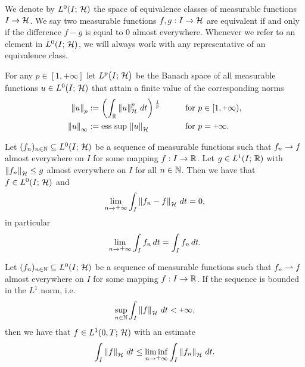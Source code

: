 \begin{definition}
	We denote by $ L^0(I;\,\mathcal{H}) $ the space of
	equivalence classes of measurable functions
	$ I\rightarrow\mathcal{H} $. We say two measurable functions 
	$ f,g:I\rightarrow\mathcal{H} $ are equivalent if and only
	if the difference $ f-g $ is equal to $ 0 $
	almost everywhere. Whenever we refer
	to an element in $ L^0(I;\,\mathcal{H}) $, we will
	always work with any representative of an equivalence
	class. 
\end{definition}

\begin{definition}\label{definition:lp space in hilbert space}
	For any $ p\in[1,\plus\infty] $ let $ L^{p}\big(I;\,\mathcal{H}\big) $
	be the Banach space of all measurable functions 
	$ u\in L^0(I;\,\mathcal{H}) $ that attain a finite value
	of the corresponding norms
	\begin{alignat*}{3}
		\atnorm{u}{p}&:=\left(\int_{\RR}\norm{u}^p\, dt\right)\strut^{\frac{1}{p}}
		\qquad &&\text{for }p\in [1,\plus\infty),\\
		\infnorm{u}&:=\esssup\,\norm{u}
		\qquad &&\text{for }p=\plus\infty.
	\end{alignat*}
\end{definition}

\begin{theorem}
	Let $ (f_n)_{n\in\mathbb{N}}\subseteq L^0(I;\,\mathcal{H}) $
	be a sequence of measurable functions such
	that $ f_n\rightarrow f $ almost everywhere on $ I $ 
	for some mapping $ f:I\rightarrow\mathbb{R} $. Let 
	$ g\in L^1(I;\,\mathbb{R}) $ with $ \left\Vert f_n\right\Vert_{\mathcal{H}}\leq g $
	almost everywhere on $ I $ for all $ n\in\mathbb{N} $.
	Then we have that $ f\in L^0(I;\,\mathcal{H}) $ and
	\begin{align*}
		\lim_{n\ra\plus\infty}\int_I \norm{f_n-f}\,dt
		=0,
	\end{align*}
	in particular
	\begin{align*}
		\lim_{n\ra\plus\infty}\int_I f_n\,dt
		=\int_I f_n\,dt.
	\end{align*}
\end{theorem}

\begin{theorem}
	Let $ (f_n)_{n\in\mathbb{N}}\subseteq L^0(I;\,\mathcal{H}) $
	be a sequence of measurable functions such
	that $ f_n\rightharpoonup f $ almost everywhere on $ I $ 
	for some mapping $ f:I\rightarrow\mathbb{R} $. If the
	sequence is bounded in the $ L^1 $ norm,
	i.e.
	\begin{align*}
		\sup_{n\in\NN}\int_I \norm{f}\,dt
		<\plus\infty,
	\end{align*}
	then we have that $ f\in L^1(0,T;\,\mathcal{H}) $ with
	an estimate
	\begin{align*}
		\int_I \norm{f}\,dt
		\leq\liminf_{n\ra\plus\infty}\int_I \norm{f_n}\,dt.
	\end{align*}
\end{theorem}

